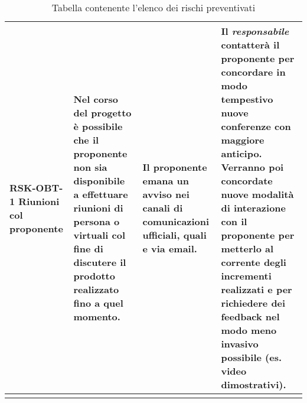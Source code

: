 \begin{center}
\begin{longtable}{|p{3cm}|p{4cm}|p{3.5cm}|p{3.5cm}|}
		RSK-OBT-1 \newline Riunioni col proponente 
		& 
		Nel corso del progetto è possibile che il proponente non sia disponibile a effettuare riunioni di persona o virtuali col fine di discutere il prodotto realizzato fino a quel momento.
		&   
		Il proponente emana un avviso nei canali di comunicazioni ufficiali, quali \glock{Slack} e via email.
		& 
		Il \textit{responsabile} contatterà il proponente per concordare in modo tempestivo nuove conferenze con maggiore anticipo. Verranno poi concordate nuove modalità di interazione con il proponente per metterlo al corrente degli incrementi realizzati e per richiedere dei feedback nel modo meno invasivo possibile (es. video dimostrativi). \\
		\hline
	
		\caption{Tabella contenente l'elenco dei rischi preventivati}
	\end{longtable}

\end{center}
